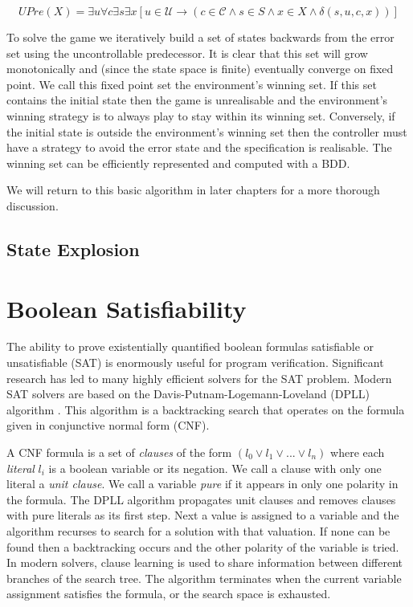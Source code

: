 $$UPre(X) = \exists u \forall c \exists s \exists x [u \in \mathcal{U} \to (c \in \mathcal{C} \land s \in S \land x \in X \land \delta(s, u, c, x))]$$

To solve the game we iteratively build a set of states backwards from the error set using the uncontrollable predecessor. It is clear that this set will grow monotonically and (since the state space is finite) eventually converge on fixed point. We call this fixed point set the environment's winning set. If this set contains the initial state then the game is unrealisable and the environment's winning strategy is to always play to stay within its winning set. Conversely, if the initial state is outside the environment's winning set then the controller must have a strategy to avoid the error state and the specification is realisable.  The winning set can be efficiently represented and computed with a BDD.

We will return to this basic algorithm in later chapters for a more thorough discussion.

\subsection{State Explosion}



\section{Boolean Satisfiability}

The ability to prove existentially quantified boolean formulas satisfiable or
unsatisfiable (SAT) is enormously useful for program verification. Significant
research has led to many highly efficient solvers for the SAT problem. Modern
SAT solvers are based on the Davis-Putnam-Logemann-Loveland (DPLL) algorithm
\cite{Davis60, Davis62}. This algorithm is a backtracking search that operates
on the formula given in conjunctive normal form (CNF).

A CNF formula is a set of \emph{clauses} of the form $(l_0 \lor l_1 \lor ...
\lor l_n)$ where each \emph{literal} $l_i$ is a boolean variable or its
negation. We call a clause with only one literal a \emph{unit clause}. We call
a variable \emph{pure} if it appears in only one polarity in the formula. The
DPLL algorithm propagates unit clauses and removes clauses with pure literals
as its first step. Next a value is assigned to a variable and the algorithm recurses to search for a solution with that valuation. If none can be found then a backtracking occurs and the other polarity of the variable is tried. In modern solvers, clause learning is used to share information between different branches of the search tree. The algorithm terminates when the current variable assignment satisfies the formula, or the search space is exhausted.

